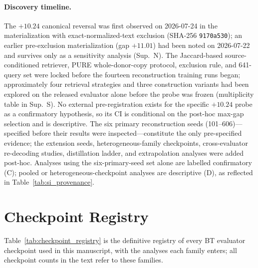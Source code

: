 \documentclass[pdflatex,sn-chicago]{sn-jnl}
\begin{document}
\paragraph{Discovery timeline.}
The $+10.24$ canonical reversal was first observed on 2026-07-24 in the materialization with exact-normalized-text exclusion (SHA-256 \texttt{9170a530}); an earlier pre-exclusion materialization (gap $+11.01$) had been noted on 2026-07-22 and survives only as a sensitivity analysis (Sup.~N). The Jaccard-based source-conditioned retriever, PURE whole-donor-copy protocol, exclusion rule, and 641-query set were locked before the fourteen reconstruction training runs began; approximately four retrieval strategies and three construction variants had been explored on the released evaluator alone before the probe was frozen (multiplicity table in Sup.~S). No external pre-registration exists for the specific $+10.24$ probe as a confirmatory hypothesis, so its CI is conditional on the post-hoc max-gap selection and is descriptive. The six primary reconstruction seeds (101--606)---specified before their results were inspected---constitute the only pre-specified evidence; the extension seeds, heterogeneous-family checkpoints, cross-evaluator re-decoding studies, distillation ladder, and extrapolation analyses were added post-hoc. Analyses using the six-primary-seed set alone are labelled confirmatory (C); pooled or heterogeneous-checkpoint analyses are descriptive (D), as reflected in Table~\ref{tab:si_provenance}.

\section{Checkpoint Registry}
\label{sec:checkpoint_registry}
Table~\ref{tab:checkpoint_registry} is the definitive registry of every BT evaluator checkpoint used in this manuscript, with the analyses each family enters; all checkpoint counts in the text refer to these families.
\end{document}
